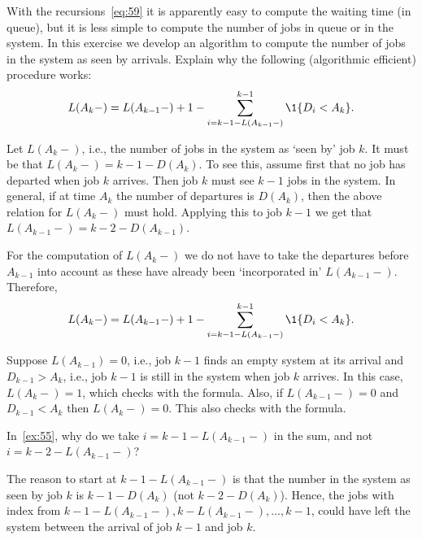 \begin{exercise}
  With the recursions~\cref{eq:59} it is apparently easy to compute the waiting time (in queue), but it is less simple to compute the number of jobs in queue or in the system.
  In this exercise we develop an algorithm to compute the number of jobs in the system as seen by arrivals.  Explain why the following (algorithmic efficient) procedure works: 
 \begin{equation*}
 L(A_k-) = L(A_{k-1}-)+1 - \sum_{i= k-1 - L(A_{k-1}-)}^{k-1} \1{D_i< A_k}.
 \end{equation*}
\begin{solution}
 Let $ L(A_{k}-)$, i.e., the number of jobs in the system as
 `seen by' job $k$. It must be that $L(A_{k}-)=k-1 - D(A_{k})$. To see
 this, assume first that no job has departed when job $k$
 arrives. Then job $k$ must see $k-1$ jobs in the system. In general,
 if at time $A_k$ the number of departures is $D(A_k)$, then the
 above relation for $L(A_k-)$ must hold. Applying this to job $k-1$ we get that $L(A_{k-1}-) = k-2 - D(A_{k-1})$. 

 For the computation of $L(A_k-)$ we do not have to take the departures
 before $A_{k-1}$ into account as these have already been
 `incorporated in' $L(A_{k-1}-)$. Therefore,
 \begin{equation*}
 L(A_k-) = L(A_{k-1}-) + 1 - \sum_{i= k-1 - L(A_{k-1}-)}^{k-1} \1{D_i< A_k}.
 \end{equation*}

 Suppose $L(A_{k-1})=0$, i.e., job $k-1$ finds an empty system at its
 arrival and $D_{k-1}>A_{k}$, i.e., job $k-1$ is still in the
 system when job $k$ arrives. In this case, $L(A_{k}-)=1$, which checks
 with the formula. Also, if $L(A_{k-1}-)=0$ and $D_{k-1}< A_k$ then
 $L(A_k-) = 0$. This also checks with the formula. 

\end{solution}
\end{exercise}


\begin{extra}
 In~\cref{ex:55}, why do we take $i=k-1-L(A_{k-1}-)$ in the sum, and not $i=k-2-L(A_{k-1}-)$?
\begin{solution}
 The reason to start at $k-1-L(A_{k-1}-)$ is that the number in the
 system as seen by job $k$ is $k-1 - D(A_k)$ (not
 $k-2-D(A_k)$). Hence, the jobs with index from
 $k-1-L(A_{k-1}-), k-L(A_{k-1}-), \ldots, k-1$, could have left the system
 between the arrival of job $k-1$ and job $k$.
\end{solution}
\end{extra}




